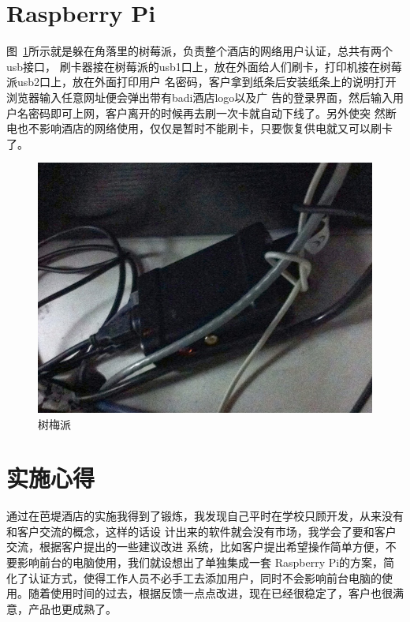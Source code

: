 \section{Raspberry Pi}

图~\ref{fig:rasp}所示就是躲在角落里的树莓派，负责整个酒店的网络用户认证，总共有两个usb接口，
刷卡器接在树莓派的usb1口上，放在外面给人们刷卡，打印机接在树莓派usb2口上，放在外面打印用户
名密码，客户拿到纸条后安装纸条上的说明打开浏览器输入任意网址便会弹出带有badi酒店logo以及广
告的登录界面，然后输入用户名密码即可上网，客户离开的时候再去刷一次卡就自动下线了。另外使突
然断电也不影响酒店的网络使用，仅仅是暂时不能刷卡，只要恢复供电就又可以刷卡了。
\begin{figure}
  \centering
    \includegraphics[width=.7\textwidth]{pic/rasp.JPG}
  \caption{树梅派}
  \label{fig:rasp}
\end{figure}

\section{实施心得}
通过在芭堤酒店的实施我得到了锻炼，我发现自己平时在学校只顾开发，从来没有和客户交流的概念，这样的话设
计出来的软件就会没有市场，我学会了要和客户交流，根据客户提出的一些建议改进
系统，比如客户提出希望操作简单方便，不要影响前台的电脑使用，我们就设想出了单独集成一套
Raspberry Pi的方案，简化了认证方式，使得工作人员不必手工去添加用户，同时不会影响前台电脑的使
用。随着使用时间的过去，根据反馈一点点改进，现在已经很稳定了，客户也很满意，产品也更成熟了。

